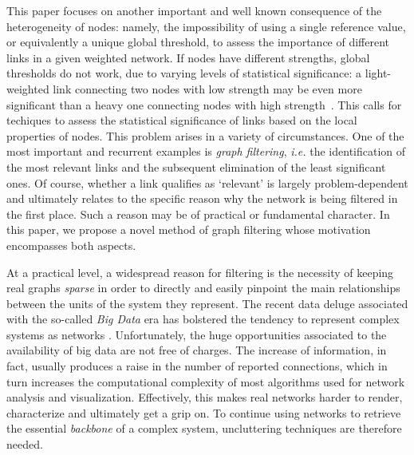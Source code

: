\documentclass[aps,twocolumn,superscriptaddress]{revtex4-1}
\newcommand{\ie}{\emph{i.e.} }
\begin{document}
This paper focuses on another important and well known consequence of the heterogeneity of nodes: namely, the impossibility of using a single reference value, or equivalently a unique global threshold, to assess the importance of different links in a given weighted network.
If nodes have different strengths, global thresholds do not work, due to varying levels of statistical significance: a light-weighted link connecting two nodes with low strength may be even more significant than a heavy one connecting nodes with high strength~\cite{granovetter-ajsoc-1973}.
This calls for techiques to assess the statistical significance of links based on the local properties of nodes.
This problem arises in a variety of circumstances.
One of the most important and recurrent examples is \emph{graph filtering}, \ie the identification of the most relevant links  and the subsequent elimination of the least significant ones.
Of course, whether a link qualifies as `relevant' is largely problem-dependent and ultimately relates to the specific reason why the network is being filtered in the first place.
Such a reason may be of practical or fundamental character. In this paper, we propose a novel method of graph filtering whose motivation encompasses both aspects.

At a practical level, a widespread reason for filtering is the necessity of keeping real graphs \emph{sparse} in order to directly and easily pinpoint the main relationships between the units of the system they represent.
The recent data deluge associated with the so-called \emph{Big Data} era \cite{lynch-nature-2008} has bolstered the tendency to represent complex systems as networks \cite{onnela-pnas-2007, blondel-epjds-2015, menche-science-2015, myers-www-2014}. Unfortunately, the huge opportunities associated to the availability of big data are not free of charges. 
The increase of information, in fact, usually produces a raise in the number of reported connections, which in turn increases the computational complexity of most algorithms used for network analysis and visualization. 
Effectively, this makes real networks harder to render, characterize and ultimately get a grip on. 
To continue using networks to retrieve the essential \emph{backbone} of a complex system, uncluttering techniques are therefore needed. 
\end{document}
